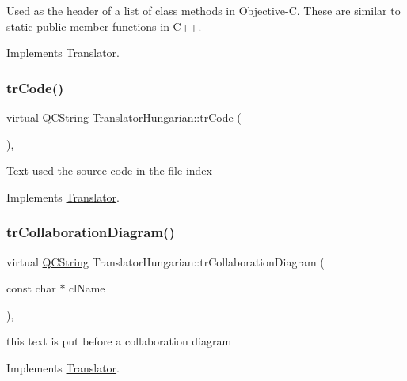 Used as the header of a list of class methods in Objective-\/C. These are similar to static public member functions in C++. 

Implements \mbox{\hyperlink{class_translator}{Translator}}.

\mbox{\label{class_translator_hungarian_af882bbe6fe0217d5eb58940b308a8cb6}} 
\subsubsection{\texorpdfstring{trCode()}{trCode()}}
{\footnotesize\ttfamily virtual \mbox{\hyperlink{class_q_c_string}{Q\+C\+String}} Translator\+Hungarian\+::tr\+Code (\begin{DoxyParamCaption}{ }\end{DoxyParamCaption})\hspace{0.3cm}{\ttfamily [inline]}, {\ttfamily [virtual]}}

Text used the source code in the file index 

Implements \mbox{\hyperlink{class_translator}{Translator}}.

\mbox{\label{class_translator_hungarian_adecbf5e32c567395b75981e6fd6401eb}} 
\subsubsection{\texorpdfstring{trCollaborationDiagram()}{trCollaborationDiagram()}}
{\footnotesize\ttfamily virtual \mbox{\hyperlink{class_q_c_string}{Q\+C\+String}} Translator\+Hungarian\+::tr\+Collaboration\+Diagram (\begin{DoxyParamCaption}\item[{const char $\ast$}]{cl\+Name }\end{DoxyParamCaption})\hspace{0.3cm}{\ttfamily [inline]}, {\ttfamily [virtual]}}

this text is put before a collaboration diagram 

Implements \mbox{\hyperlink{class_translator}{Translator}}.

\mbox{\label{class_translator_hungarian_a5595baa017a497987dadecf9403bdf80}} 
